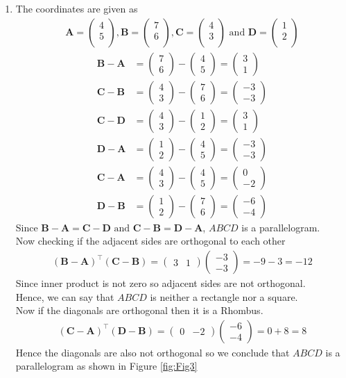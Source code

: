 \documentclass[12pt]{article}
\newcommand{\myvec}[1]{\ensuremath{\begin{pmatrix}#1\end{pmatrix}}}
\let\vec\mathbf
\begin{document}
\begin{enumerate}
\item The coordinates are given as
	\begin{align}
	\vec{A} = \myvec{
		4\\
		5\\
		},
	\vec{B} = \myvec{
		7\\
		6\\
		},
	\vec{C} = \myvec{
		4\\
		3\\
		} \text{ and }
	\vec{D} = \myvec{
		1\\
		2\\
		}
	\end{align}
	\begin{align}
		\vec{B} - \vec{A} &= \myvec{7\\6} - \myvec{4\\5} = \myvec{3\\1}\\
		\vec{C} - \vec{B} &= \myvec{4\\3} - \myvec{7\\6} = \myvec{-3\\-3}\\
		\vec{C} - \vec{D} &= \myvec{4\\3} - \myvec{1\\2} = \myvec{3\\1}\\
		\vec{D} - \vec{A} &= \myvec{1\\2} - \myvec{4\\5} = \myvec{-3\\-3}\\
		\vec{C} - \vec{A} &= \myvec{4\\3} - \myvec{4\\5} = \myvec{0\\-2}\\
		\vec{D} - \vec{B} &= \myvec{1\\2} - \myvec{7\\6} = \myvec{-6\\-4}
	\end{align}	
	Since $\vec{B}-\vec{A} = \vec{C}-\vec{D} \text{ and } \vec{C}-\vec{B} = \vec{D}-\vec{A}$, $ABCD$ is a parallelogram.\\
	Now checking if the adjacent sides are orthogonal to each other
	\begin{align}
		(\vec{B}-\vec{A})^\top (\vec{C}-\vec{B}) = \myvec{3&1} \myvec{-3\\-3} = -9-3 = -12
	\end{align}
	Since inner product is not zero so adjacent sides are not orthogonal.\\
	Hence, we can say that $ABCD$ is neither a rectangle nor a square.\\
	Now if the diagonals are orthogonal then it is a Rhombus.
	\begin{align}
		(\vec{C}- \vec{A})^\top (\vec{D}-\vec{B}) = \myvec{0&-2} \myvec{-6\\-4} = 0+8 = 8
	\end{align}
	Hence the diagonals are also not orthogonal so we conclude that $ABCD$ is a parallelogram as shown in Figure \ref{fig:Fig3}


\end{enumerate}
\end{document}
